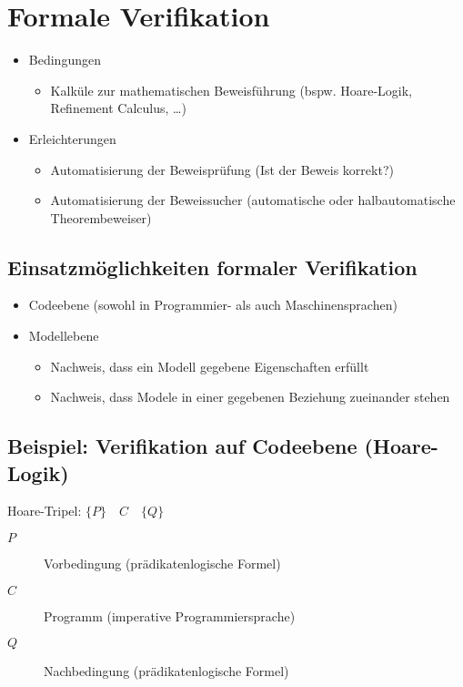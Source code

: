 													\section{Formale Verifikation}
														\begin{itemize}
															\item Bedingungen
																\begin{itemize}
																	\item Kalküle zur mathematischen Beweisführung (bspw. Hoare-Logik, Refinement Calculus, \dots)
																\end{itemize}
															\item Erleichterungen
																\begin{itemize}
																	\item Automatisierung der Beweisprüfung (Ist der Beweis korrekt?)
																	\item Automatisierung der Beweissucher (automatische oder halbautomatische Theorembeweiser)
																\end{itemize}
														\end{itemize}

														\subsection{Einsatzmöglichkeiten formaler Verifikation}
															\begin{itemize}
																\item Codeebene (sowohl in Programmier- als auch Maschinensprachen)
																\item Modellebene
																	\begin{itemize}
																		\item Nachweis, dass ein Modell gegebene Eigenschaften erfüllt
																		\item Nachweis, dass Modele in einer gegebenen Beziehung zueinander stehen
																	\end{itemize}
															\end{itemize}

														\subsection{Beispiel: Verifikation auf Codeebene (Hoare-Logik)}
															Hoare-Tripel: $ \{ P \} \quad C \quad \{ Q \} $
															\begin{description}
																\item[$ P $] Vorbedingung (prädikatenlogische Formel)
																\item[$ C $] Programm (imperative Programmiersprache)
																\item[$ Q $] Nachbedingung (prädikatenlogische Formel)
															\end{description}

